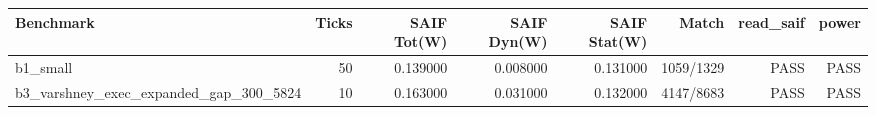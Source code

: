\begin{tabular}{lrrrrrrr}
\hline
Benchmark & Ticks & SAIF Tot(W) & SAIF Dyn(W) & SAIF Stat(W) & Match & read\_saif & power \\
\hline
b1\_small & 50 & 0.139000 & 0.008000 & 0.131000 & 1059/1329 & PASS & PASS \\
b3\_varshney\_exec\_expanded\_gap\_300\_5824 & 10 & 0.163000 & 0.031000 & 0.132000 & 4147/8683 & PASS & PASS \\
\hline
\end{tabular}
